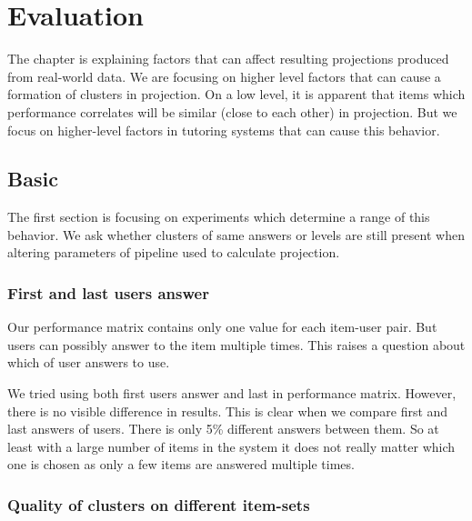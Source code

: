 \documentclass[
  digital, %
  table,   %
  nolof,     %
  nolot,     %
  nocover,
  color
]{fithesis3}
\begin{document}

\chapter{Evaluation}\label{evaluation}

The chapter is explaining factors that can affect resulting projections produced from real-world data. We are focusing on higher level factors that can cause a formation of clusters in projection. On a low level, it is apparent that items which performance correlates will be similar (close to each other) in projection. But we focus on higher-level factors in tutoring systems that can cause this behavior.

\section{Basic}\label{evaluation-basic}

The first section is focusing on experiments which determine a range of this behavior. We ask whether clusters of same answers or levels are still present when altering parameters of pipeline used to calculate projection.

\subsection{First and last users answer}\label{first-and-last-users-answer}


Our performance matrix contains only one value for each item-user pair. But users can possibly answer to the item multiple times. This raises a question about which of user answers to use.


We tried using both first users answer and last in performance matrix. However, there is no visible difference in results. This is clear when we compare first and last answers of users. There is only 5\% different answers between them. So at least with a large number of items in the system it does not really matter which one is chosen as only a few items are answered multiple times.

\subsection{Quality of clusters on different item-sets}\label{quality-of-clusters}
\end{document}
